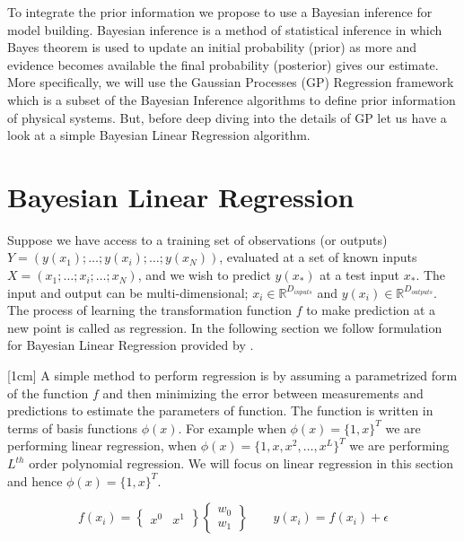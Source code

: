 To integrate the prior information we propose to use a Bayesian inference for model building. Bayesian inference is a method of statistical inference in which Bayes theorem is used to update an initial probability (prior) as more and evidence becomes available the final probability (posterior) gives our estimate. More specifically, we will use the Gaussian Processes (GP) Regression framework which is a subset of the Bayesian Inference algorithms to define prior information of physical systems. But, before deep diving into the details of GP let us have a look at a simple Bayesian Linear Regression algorithm.

\section{Bayesian Linear Regression}\label{secBayesianModelling}
Suppose we have access to a training set of observations (or outputs) \(Y = (y(x_{1}); \ldots ; y(x_{i}); \ldots ; y(x_{N}))\), evaluated at a set of known inputs \(X = (x_{1}; \ldots ; x_{i}; \ldots; x_{N})\), and we wish to predict \(y(x_{*})\) at a test input \(x_{*}\). The input and output can be multi-dimensional; \(x_{i} \in \mathbb{R}^{D_{inputs}}\) and \(y(x_{i}) \in \mathbb{R}^{D_{outputs}}\). The process of learning the transformation function \(f\) to make prediction at a new point is called as regression. In the following section we follow formulation for Bayesian Linear Regression provided by \cite{mackay2003information}.

[1cm]
A simple method to perform regression is by assuming a parametrized form of the function \(f\) and then minimizing the error between measurements and predictions to estimate the parameters of function. The function is written in terms of basis functions \(\phi(x)\). For example when \(\phi(x) = \{1, x\}^{T}\) we are performing linear regression, when \(\phi(x) = \{1, x, x^{2}, \ldots, x^{L}\}^{T}\) we are performing \(L^{th}\) order polynomial regression. We will focus on linear regression in this section and hence \(\phi(x) = \{1, x\}^{T}\).

\begin{equation}\label{eqBayesianLinearRegression}
f(x_{i}) = \begin{Bmatrix}
x^{0} & x^{1}
\end{Bmatrix}  \begin{Bmatrix}
w_{0}\\ 
w_{1}
\end{Bmatrix}
\quad \quad y(x_{i}) = f(x_{i}) + \epsilon
\end{equation}

